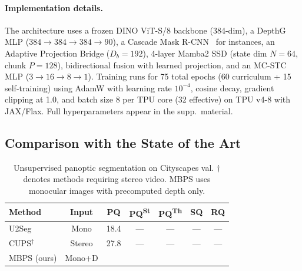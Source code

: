 \documentclass[10pt,twocolumn,letterpaper]{article}
\begin{document}
\paragraph{Implementation details.}
The architecture uses a frozen DINO ViT-S/8 backbone (384-dim), a DepthG MLP ($384{\to}384{\to}384{\to}90$), a Cascade Mask R-CNN~\cite{cai2019cascade} for instances, an Adaptive Projection Bridge ($D_b{=}192$), 4-layer Mamba2 SSD (state dim $N{=}64$, chunk $P{=}128$), bidirectional fusion with learned projection, and an MC-STC MLP ($3{\to}16{\to}8{\to}1$). Training runs for 75 total epochs (60 curriculum + 15 self-training) using AdamW with learning rate $10^{-4}$, cosine decay, gradient clipping at 1.0, and batch size 8 per TPU core (32 effective) on TPU v4-8 with JAX/Flax. Full hyperparameters appear in the supp.\ material.


\subsection{Comparison with the State of the Art}

\begin{table}[t]
\centering
\caption{Unsupervised panoptic segmentation on Cityscapes val. $\dagger$ denotes methods requiring stereo video. MBPS uses monocular images with precomputed depth only.}
\label{tab:main_cityscapes}
\setlength{\tabcolsep}{2.5pt}
\begin{tabular}{lcccccc}
\toprule
Method & Input & PQ & PQ\textsuperscript{St} & PQ\textsuperscript{Th} & SQ & RQ \\
\midrule
U2Seg~\cite{niu2024u2seg} & Mono & 18.4 & --- & --- & --- & --- \\
CUPS$^\dagger$~\cite{hahn2025cups} & Stereo & 27.8 & --- & --- & --- & --- \\
\midrule
MBPS (ours) & Mono+D & \underline{\hspace{1.5em}} & \underline{\hspace{1.5em}} & \underline{\hspace{1.5em}} & \underline{\hspace{1.5em}} & \underline{\hspace{1.5em}} \\
\bottomrule
\end{tabular}
\end{table}
\end{document}
